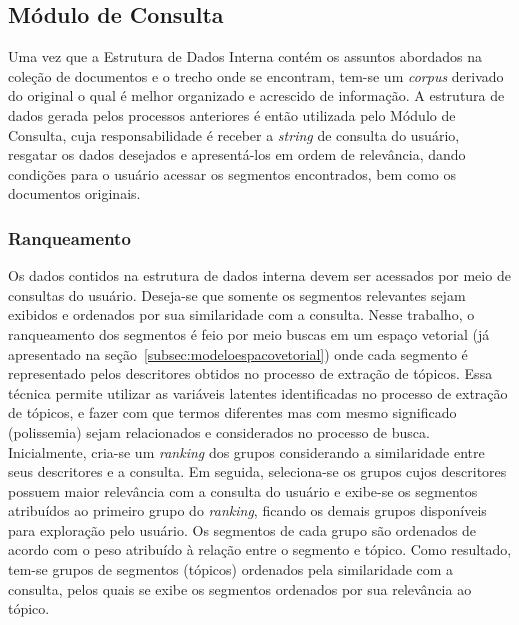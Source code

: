 
\subsection{Módulo de Consulta}


Uma vez que a Estrutura de Dados Interna contém os assuntos abordados na coleção de documentos e o trecho onde se encontram, tem-se um \textit{corpus} derivado do original o qual é melhor organizado e acrescido de informação. A estrutura de dados gerada pelos processos anteriores é então utilizada pelo Módulo de Consulta, cuja responsabilidade é receber a \textit{string} de consulta do usuário, resgatar os dados desejados e apresentá-los em ordem de relevância, dando condições para o usuário acessar os segmentos encontrados, bem como os documentos originais.

\subsubsection{Ranqueamento}

Os dados contidos na estrutura de dados interna devem ser acessados por meio de consultas do usuário. Deseja-se que somente os segmentos relevantes sejam exibidos e ordenados por sua similaridade com a consulta. 
Nesse trabalho, o ranqueamento dos segmentos é feio por meio buscas em um espaço vetorial (já apresentado na seção~\ref{subsec:modeloespacovetorial}) onde cada segmento é representado pelos descritores obtidos no processo de extração de tópicos. Essa técnica permite utilizar as variáveis latentes identificadas no processo de extração de tópicos, e fazer com que termos diferentes mas com mesmo significado (polissemia) sejam relacionados e considerados no processo de busca.
Inicialmente, cria-se um \textit{ranking} dos grupos considerando a similaridade entre seus descritores e a consulta. Em seguida, seleciona-se os grupos cujos descritores possuem maior relevância com a consulta do usuário e exibe-se os segmentos atribuídos ao primeiro grupo do \textit{ranking}, ficando os demais grupos disponíveis para exploração pelo usuário. 
Os segmentos de cada grupo são ordenados de acordo com o peso atribuído à relação entre o segmento e tópico.  Como resultado, tem-se grupos de segmentos (tópicos) ordenados pela similaridade com a consulta, pelos quais se exibe os segmentos ordenados por sua relevância ao tópico. 






